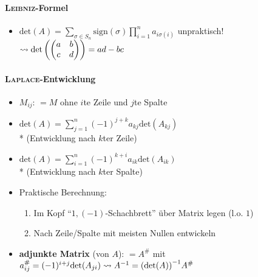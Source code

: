 \paragraph{\textsc{Leibniz}-Formel}
\begin{itemize}
	\item $\text{det}(A)=\sum_{\sigma \in S_n} \text{sign}(\sigma) \prod_{i=1}^n a_{i \sigma(i)}$ unpraktisch! $ \\* \leadsto \text{det}\left( \begin{pmatrix} a & b \\ c & d \end{pmatrix} \right) = ad-bc$
\end{itemize}

\paragraph{\textsc{Laplace}-Entwicklung}
\begin{itemize}
	\item \textbf{$M_{ij}$}: $=M$ ohne $i$te Zeile und $j$te Spalte
	\item $\text{det}(A)=\sum_{j=1}^n (-1)^{j+k}a_{kj}\text{det}(A_{kj})$ \\* (Entwicklung nach $k$ter Zeile)
	\item $\text{det}(A)=\sum_{i=1}^n (-1)^{k+i}a_{ik}\text{det}(A_{ik})$ \\* (Entwicklung nach $k$ter Spalte)
	\item Praktische Berechnung:
	\begin{enumerate}
		\item Im Kopf ``$1, (-1)$-Schachbrett'' über Matrix legen (l.o. $1$)
		\item Nach Zeile/Spalte mit meisten Nullen entwickeln
	\end{enumerate}
	\item \textbf{adjunkte Matrix} (von $A$): $=A^{\#}$ mit $a_{ij}^\# = (-1)^{i+j} \text{det}(A_{ji}) \\* \leadsto A^{-1}= {(\text{det}(A))}^{-1} A^\#$
\end{itemize}

